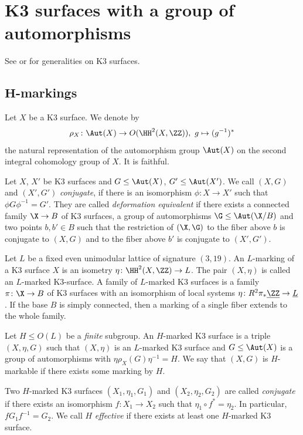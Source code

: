 \section{K3 surfaces with a group of automorphisms}\label{k3moduli}
See \cite{bhpv} or \cite{huybrechts2016} for generalities on K3 surfaces.
\subsection{$\mathbf{H}$-markings}
Let $X$ be a K3 surface. We denote by
\[\rho_X\colon \Aut(X) \rightarrow O(\HH^2(X,\ZZ)),\  g\mapsto (g^{-1})^*\]
the natural representation of the automorphism group $\Aut(X)$ on the second integral cohomology group of $X$.
It is faithful.
\begin{definition}\label{defequivalent}
Let $X$, $X'$ be K3 surfaces and $G \leq \Aut(X)$, $G' \leq \Aut(X')$. We call $(X,G)$ and $(X',G')$ \emph{conjugate}, if
there is an isomorphism $\phi\colon X \to X'$ such that
$\phi G \phi^{-1} = G'$.
  They are called \emph{deformation equivalent} if there exists a connected family $\X \to B$ of K3 surfaces, a group of automorphisms $\G \leq \Aut(\X/B)$ and
two points $b,b' \in B$ such that the restriction of $(\X,\G)$ to the
fiber above $b$ is conjugate to $(X,G)$ and to the fiber above $b'$ is conjugate to $(X',G')$.
\end{definition}

Let $L$ be a fixed even unimodular lattice of signature $(3,19)$.
An $L$-marking of a K3 surface $X$ is an isometry
$\eta \colon \HH^2(X,\ZZ) \to L$.
The pair $(X, \eta)$ is called an $L$-marked K3-surface.
A family of $L$-marked K3 surfaces is a family $\pi \colon \X \to B$ of K3 surfaces with an isomorphism of local systems $\eta \colon R^2\pi_*\underline{\ZZ} \to \underline{L}$. If the base $B$ is simply connected, then a marking of a single fiber extends to the whole family.

\begin{definition}
  Let $H \leq O(L)$ be a \emph{finite} subgroup. An $H$-marked K3 surface is a triple $(X, \eta, G)$ such that $(X, \eta)$ is an $L$-marked K3 surface and $G \leq \Aut(X)$ is a group of automorphisms with $\eta \rho_X(G) \eta^{-1} = H$.
 We say that $(X,G)$ is $H$-markable if there exists some marking by $H$.

 Two $H$-marked K3 surfaces $(X_1, \eta_1, G_1)$
 and $(X_2,\eta_2, G_2)$ are called \emph{conjugate} if there exists an isomorphism $f \colon X_1 \to X_2$ such that $\eta_1 \circ f^* = \eta_2$. In particular, $fG_1f^{-1}=G_2$. We call $H$ \emph{effective} if there exists at least one $H$-marked K3 surface.
\end{definition}

